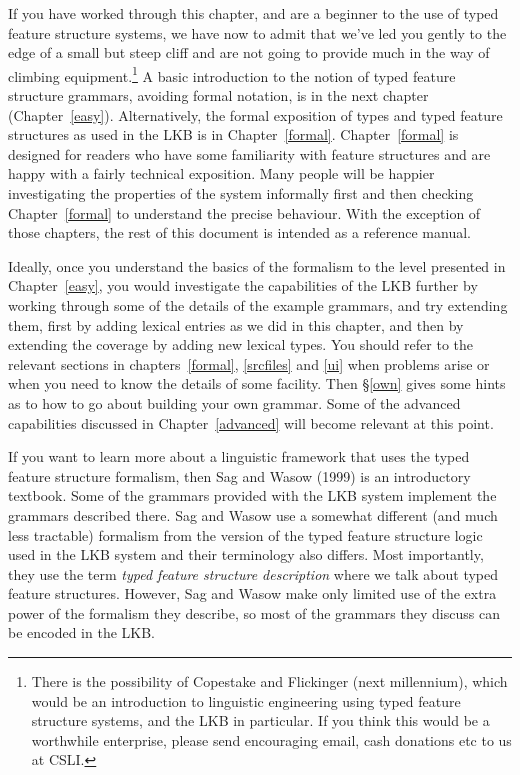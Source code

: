 \documentclass[12pt]{report}
\newcommand{\newterm}[1]{{\it #1}}
\begin{document}
If you have worked through this chapter, and are a beginner to the use of typed
feature structure systems, we have now to admit that we've led you gently to
the edge of a small but steep cliff and are not going to provide much in the
way of climbing equipment.\footnote{There is the possibility of Copestake and
Flickinger (next millennium), which would be an introduction to linguistic
engineering using typed feature structure systems, and the LKB in particular.
If you think this would be a worthwhile enterprise, please send encouraging
email, cash donations etc to us at CSLI.}  
A basic introduction to the notion of typed feature structure
grammars, avoiding formal notation,
is in the next chapter (Chapter~\ref{easy}).
Alternatively, the 
formal exposition of types and typed feature structures as used in the LKB
is in Chapter~\ref{formal}.  
Chapter~\ref{formal} is designed for readers who have some familiarity
with feature structures and are happy with a fairly technical exposition.  
Many people will be happier investigating the properties of the
system informally first and then checking Chapter~\ref{formal} 
to understand the precise behaviour.  With
the exception of those chapters, the rest of this document is intended as a
reference manual.  

Ideally, once you understand the basics of the formalism to the level presented
in Chapter~\ref{easy}, you would investigate the capabilities of the LKB
further by working through some of the details of the example grammars, and try
extending them, first by adding lexical entries as we did in this chapter, and
then by extending the coverage by adding new lexical types.  You should refer
to the relevant sections in chapters~\ref{formal}, \ref{srcfiles} and \ref{ui}
when problems arise or when you need to know the details of some facility.
Then \S\ref{own} gives some hints as to how to go about building your own
grammar.  Some of the advanced capabilities discussed in Chapter~\ref{advanced}
will become relevant at this point.

If you want to learn more about a linguistic framework that uses the typed
feature structure formalism, then Sag and Wasow (1999) is an introductory
textbook.  Some of the grammars provided with the LKB system implement the
grammars described there.  Sag and Wasow use a somewhat different (and much
less tractable) formalism from the version of the typed feature structure logic
used in the LKB system and their terminology also differs.  Most importantly,
they use the term \newterm{typed feature structure description} where we talk
about typed feature structures.  However, Sag and Wasow make only limited
use of the extra power of the formalism they describe, so most of the grammars
they discuss can be encoded in the LKB.
\end{document}
